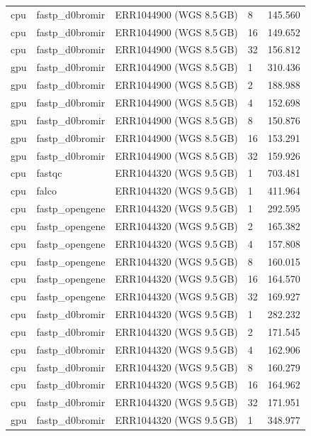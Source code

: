 \documentclass[a4paper,12pt]{article}
\begin{document}
\begin{longtable}{llllr}
  cpu & fastp\_d0bromir & ERR1044900 (WGS 8.5\,GB) & 8  & 145.560 \\
  cpu & fastp\_d0bromir & ERR1044900 (WGS 8.5\,GB) & 16 & 149.652 \\
  cpu & fastp\_d0bromir & ERR1044900 (WGS 8.5\,GB) & 32 & 156.812 \\
  gpu & fastp\_d0bromir & ERR1044900 (WGS 8.5\,GB) & 1  & 310.436 \\
  gpu & fastp\_d0bromir & ERR1044900 (WGS 8.5\,GB) & 2  & 188.988 \\
  gpu & fastp\_d0bromir & ERR1044900 (WGS 8.5\,GB) & 4  & 152.698 \\
  gpu & fastp\_d0bromir & ERR1044900 (WGS 8.5\,GB) & 8  & 150.876 \\
  gpu & fastp\_d0bromir & ERR1044900 (WGS 8.5\,GB) & 16 & 153.291 \\
  gpu & fastp\_d0bromir & ERR1044900 (WGS 8.5\,GB) & 32 & 159.926 \\
  cpu & fastqc & ERR1044320 (WGS 9.5\,GB) & 1 & 703.481 \\
  cpu & falco  & ERR1044320 (WGS 9.5\,GB) & 1 & 411.964 \\
  cpu & fastp\_opengene & ERR1044320 (WGS 9.5\,GB) & 1  & 292.595 \\
  cpu & fastp\_opengene & ERR1044320 (WGS 9.5\,GB) & 2  & 165.382 \\
  cpu & fastp\_opengene & ERR1044320 (WGS 9.5\,GB) & 4  & 157.808 \\
  cpu & fastp\_opengene & ERR1044320 (WGS 9.5\,GB) & 8  & 160.015 \\
  cpu & fastp\_opengene & ERR1044320 (WGS 9.5\,GB) & 16 & 164.570 \\
  cpu & fastp\_opengene & ERR1044320 (WGS 9.5\,GB) & 32 & 169.927 \\
  cpu & fastp\_d0bromir & ERR1044320 (WGS 9.5\,GB) & 1  & 282.232 \\
  cpu & fastp\_d0bromir & ERR1044320 (WGS 9.5\,GB) & 2  & 171.545 \\
  cpu & fastp\_d0bromir & ERR1044320 (WGS 9.5\,GB) & 4  & 162.906 \\
  cpu & fastp\_d0bromir & ERR1044320 (WGS 9.5\,GB) & 8  & 160.279 \\
  cpu & fastp\_d0bromir & ERR1044320 (WGS 9.5\,GB) & 16 & 164.962 \\
  cpu & fastp\_d0bromir & ERR1044320 (WGS 9.5\,GB) & 32 & 171.951 \\
  gpu & fastp\_d0bromir & ERR1044320 (WGS 9.5\,GB) & 1  & 348.977 \\

\end{longtable}
\end{document}
